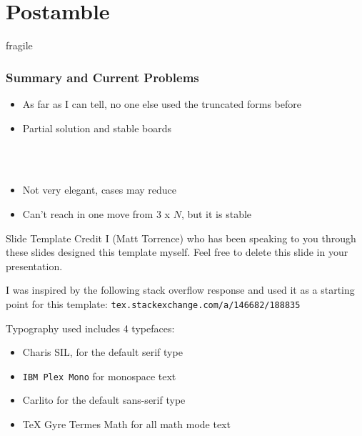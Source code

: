 \documentclass[aspectratio=169,usenames,dvipsnames]{beamer}
\begin{document}
\section{Postamble}
\begin{frame}{fragile}
    \frametitle{Summary and Current Problems}
    
    \begin{itemize}
        \item As far as I can tell, no one else used the truncated forms before
        \item Partial solution and stable boards
    \end{itemize}
    
    $  $\\
    $  $\\
    
    \begin{itemize}
        \item Not very elegant, cases may reduce
        \item Can't reach in one move from $3$ x $N$, but it is stable
    \end{itemize}
\end{frame}

\begin{frame}{Slide Template Credit}
I (Matt Torrence) who has been speaking to you through these slides designed this template myself. Feel free to delete this slide in your presentation.

\s I was inspired by the following stack overflow response and used it as a starting point for this template: \texttt{tex.stackexchange.com/a/146682/188835}

\s Typography used includes 4 typefaces:

\begin{itemize}
\item Charis SIL, for the default serif type
\item \texttt{IBM Plex Mono} for monospace text
\item {\sansstyle Carlito} for the default sans-serif type
\item TeX Gyre Termes Math for all math mode text
\end{itemize}


\end{frame}
\end{document}
